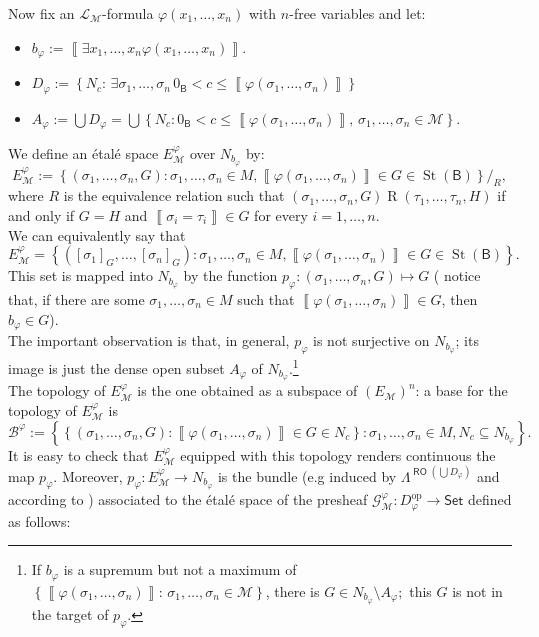 \documentclass[11pt]{amsart}
\newcommand{\nphi}{\varphi}
\newcommand{\LL}{\mathcal{L}}
\newcommand{\G}{\mathcal{G}}
\theoremstyle{plain}
\theoremstyle{definition}
\theoremstyle{plain}
\theoremstyle{remark}
\newcommand{\M}{\mathcal{M}}
\newcommand{\dSet}{\mathsf{Set}}
\DeclareMathOperator{\St}{St}
\DeclareMathOperator{\RO}{\mathsf{RO}}
\newcommand{\bool}[1]{\mathsf{#1}}
\newcommand{\cp}[1]{\left( #1 \right)}
\newcommand{\Qp}[1]{\left\llbracket #1 \right\rrbracket}
\newcommand{\bp}[1]{\left\lbrace #1 \right\rbrace}
\newcommand{\0}{\mathsf{0}}
\renewcommand{\1}{\mathsf{1}}
\renewcommand{\2}{\mathsf{2}}
\theoremstyle{definition}
\begin{document}
Now fix an $\LL_\M$-formula $\nphi(x_1, \dots, x_n)$ with $n$-free variables and let:
\begin{itemize}
\item
 $b_\nphi:=\Qp{\exists x_1, \dots, x_n\nphi(x_1, \dots, x_n)}$.
 \item
 $D_\nphi:=\bp{N_c: \,\exists \sigma_1,\dots,\sigma_n\, 0_\bool{B}<c\leq 
 \Qp{\nphi(\sigma_1, \dots, \sigma_n)}}$
 \item
 $A_\nphi:=\bigcup D_\nphi=\bigcup\bp{N_c:0_\bool{B}<c\leq\Qp{\nphi(\sigma_1, \dots, \sigma_n)},\, \sigma_1,\dots,\sigma_n\in\mathcal{M}}$.
 \end{itemize}
  We define an \'etal\'e space $E^\nphi_\M$ over 
$N_{b_\nphi}$ 
by:
\[
E^\nphi_\M:=\bp{\cp{\sigma_1, \dots, \sigma_n, G}: \sigma_1, \dots, \sigma_n\in M, \Qp{\nphi(\sigma_1, \dots, \sigma_n)}\in G\in \St(\bool{B})}/_R,
\]
where $R$ is the equivalence relation such that $\cp{\sigma_1, \dots, \sigma_n, G}\mathrel{R}\cp{\tau_1, \dots, \tau_n, H}$ if and only if $G=H$ and $\Qp{\sigma_i=\tau_i}\in G$ for every $i=1, \dots, n$.\\
We can equivalently say that
\[
E^\nphi_\M=\bp{\cp{[\sigma_1]_G, \dots, [\sigma_n]_G}: \sigma_1, \dots, \sigma_n\in M, \Qp{\nphi(\sigma_1, \dots, \sigma_n)}\in G\in\St(\bool{B})}.
\]
This set is mapped into $N_{b_\nphi}$ by the function $p_\nphi:\cp{\sigma_1, \dots, \sigma_n, G}\mapsto G$ ( notice that, if there are some $\sigma_1, \dots, \sigma_n\in M$ such that $\Qp{\nphi(\sigma_1, \dots, \sigma_n)}\in G$, then $b_\nphi\in G$).\\
The important observation is that, in general, $p_\nphi$ is not surjective on $N_{b_\nphi}$; 
its image is just the dense open subset $A_\nphi$
of $N_{b_\nphi}$.\footnote{If $b_\nphi$ is a supremum but not a maximum of $\bp{\Qp{\nphi(\sigma_1, \dots, \sigma_n)}: \,\sigma_1,\dots,\sigma_n\in\M}$, there is 
$G\in N_{b_\nphi}\setminus A_\nphi;$
this $G$ is not in the target of $p_\nphi$.}  \\
The topology of $E^\nphi_\M$ is the one obtained as a subspace of $(E_\M)^n$: a base for the topology of $E^\nphi_\M$ is
\[
\mathcal{B}^\nphi:=\bp{\bp{\cp{\sigma_1, \dots, \sigma_n, G}: \Qp{\nphi(\sigma_1, \dots, \sigma_n)}\in G\in N_c}: \sigma_1, \dots, \sigma_n\in M, N_c\subseteq N_{b_\nphi}}.
\]
It is easy to check that $E^\nphi_\M$ equipped with this topology renders continuous the map $p_\nphi$. 
Moreover, $p_\nphi:E^\nphi_\M\to N_{b_\nphi}$ is the bundle (e.g induced by $\Lambda^{\RO(\bigcup D_\nphi)}$ and according to \cite[II]{MacLMoer}) associated to the \'etal\'e space of the presheaf $\G^\nphi_\M:D_{\nphi}^{\textrm{op}}\to\dSet$ defined as follows:
\end{document}
